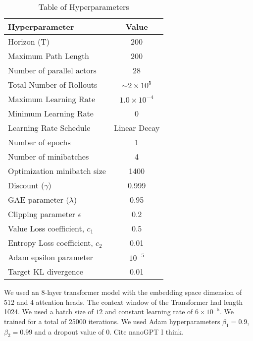 \begin{table}[ht]
    \centering
    \begin{tabular}{lc}
        \hline
        Hyperparameter & Value \\
        \hline
        Horizon (T) & 200 \\
        Maximum Path Length & 200 \\
        Number of parallel actors & 28 \\
        Total Number of Rollouts & $\sim 2 \times 10^5$ \\
        Maximum Learning Rate & $1.0 \times 10^{-4}$ \\
        Minimum Learning Rate & 0 \\
        Learning Rate Schedule & Linear Decay \\
        Number of epochs & 1 \\
        Number of minibatches & 4 \\
        Optimization minibatch size & 1400 \\
        Discount ($\gamma$) & 0.999 \\
        GAE parameter ($\lambda$) & 0.95 \\
        Clipping parameter $\epsilon$ & 0.2 \\
        Value Loss coefficient, $c_1$ & 0.5 \\
        Entropy Loss coefficient, $c_2$ & 0.01 \\
        Adam epsilon parameter & $10^{-5}$ \\
        Target KL divergence & 0.01 \\
        \hline
    \end{tabular}
    \caption{Table of Hyperparameters}
    \label{tab:ppo_hyperparameters}
\end{table}

We used an 8-layer transformer model with the embedding space dimension of $512$ and 4 attention heads. The context window of the Transformer had length 1024. We used a batch size of $12$ and constant learning rate of $6 \times 10^{-5}$. We trained for a total of 25000 iterations. We used Adam hyperparameters $\beta_1 = 0.9$, $\beta_2 = 0.99$ and a dropout value of $0$. Cite nanoGPT I think.
